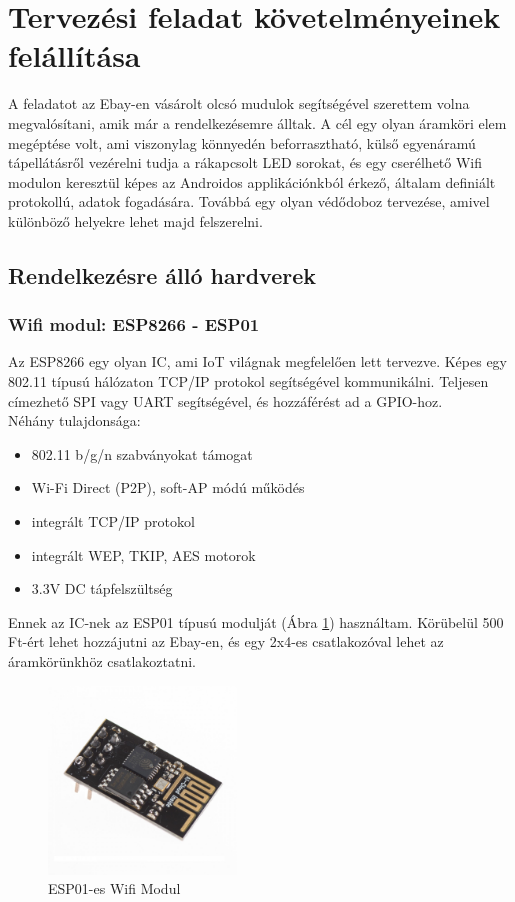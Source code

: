 \documentclass[../main.tex]{subfiles}
\begin{document}
\section{Tervezési feladat követelményeinek felállítása}
    A feladatot az Ebay-en vásárolt olcsó mudulok segítségével szerettem volna megvalósítani, amik már a rendelkezésemre álltak. A cél egy olyan áramköri elem megéptése volt, ami viszonylag könnyedén beforrasztható, külső egyenáramú tápellátásről vezérelni tudja a rákapcsolt LED sorokat, és egy cserélhető Wifi modulon keresztül képes az Androidos applikációnkból érkező, általam definiált protokollú, adatok fogadására. Továbbá egy olyan védődoboz tervezése, amivel különböző helyekre lehet majd felszerelni.
    
    \subsection{Rendelkezésre álló hardverek}
        \subsubsection{Wifi modul: ESP8266 - ESP01} %
            Az ESP8266 egy olyan IC, ami IoT világnak megfelelően lett tervezve. Képes egy 802.11 típusú hálózaton TCP/IP protokol segítségével kommunikálni. Teljesen címezhető SPI vagy UART segítségével, és hozzáférést ad a GPIO-hoz.\\[12px]
            Néhány tulajdonsága:
            \begin{itemize}
                \item 802.11 b/g/n szabványokat támogat
                \item Wi-Fi Direct (P2P), soft-AP módú működés
                \item integrált TCP/IP protokol
                \item integrált WEP, TKIP, AES motorok
                \item 3.3V DC tápfelszültség
            \end{itemize}
            
            Ennek az IC-nek az ESP01 típusú modulját (Ábra \ref{fig:esp01}) használtam. Körübelül 500 Ft-ért lehet hozzájutni az Ebay-en, és egy 2x4-es csatlakozóval lehet az áramkörünkhöz csatlakoztatni.
            
            \begin{figure}[h!]
                \centering
                \includegraphics[width=5cm]{resources/pcb_res/esp01.jpg}
                \caption{ESP01-es Wifi Modul}
                \label{fig:esp01}
            \end{figure}
        
\end{document}
